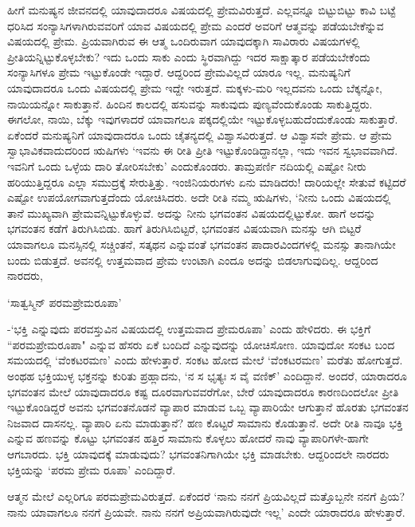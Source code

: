 ಹೀಗೆ ಮನುಷ್ಯನ ಜೀವನದಲ್ಲಿ 
ಯಾವುದಾದರೂ ವಿಷಯದಲ್ಲಿ 
ಪ್ರೇಮವಿರುತ್ತದೆ. ಎಲ್ಲವನ್ನೂ 
ಬಿಟ್ಟುಬಿಟ್ಟು ಕಾವಿ ಬಟ್ಟೆ 
ಧರಿಸಿದ 
ಸಂನ್ಯಾಸಿಗಳಾಗಿರುವವರಿಗೆ 
ಯಾವ ವಿಷಯದಲ್ಲಿ ಪ್ರೇಮ ಎಂದರೆ 
ಅವರಿಗೆ ಆತ್ಮವನ್ನು 
ಪಡೆಯಬೇಕೆನ್ನುವ ವಿಷಯದಲ್ಲಿ 
ಪ್ರೇಮ. ಪ್ರಿಯವಾಗಿರುವ ಈ ಆತ್ಮ 
ಒಂದಿರುವಾಗ ಯಾವುದಕ್ಕಾಗಿ 
ಸಾವಿರಾರು ವಿಷಯಗಳಲ್ಲಿ 
ಪ್ರೀತಿಯನ್ನಿಟ್ಟುಕೊಳ್ಳಬೇಕು? ಇದು ಒಂದು ಸಾಕು ಎಂದು ಸ್ಥಿರವಾಗಿದ್ದು ಇದರ ಸಾಕ್ಷಾತ್ಕಾರ ಪಡೆಯಬೇಕೆಂದು ಸಂನ್ಯಾಸಿಗಳೂ ಪ್ರೇಮ ಇಟ್ಟುಕೊಂಡೇ ಇದ್ದಾರೆ. ಆದ್ದರಿಂದ ಪ್ರೇಮವಿಲ್ಲದೆ ಯಾರೂ ಇಲ್ಲ. ಮನುಷ್ಯನಿಗೆ ಯಾವುದಾದರೂ ಒಂದು ವಿಷಯದಲ್ಲಿ ಪ್ರೇಮ ಇದ್ದೇ ಇರುತ್ತದೆ. ಮಕ್ಕಳು-ಮರಿ ಇಲ್ಲದವನು ಒಂದು ಬೆಕ್ಕನ್ನೋ, ನಾಯಿಯನ್ನೋ ಸಾಕುತ್ತಾನೆ. ಹಿಂದಿನ ಕಾಲದಲ್ಲಿ ಹಸುವನ್ನು ಸಾಕುವುದು ಪುಣ್ಯವೆಂದುಕೊಂಡು ಸಾಕುತ್ತಿದ್ದರು. ಈಗಲೋ, ನಾಯಿ, ಬೆಕ್ಕು ಇವುಗಳಾದರೆ ಯಾವಾಗಲೂ ಪಕ್ಕದಲ್ಲಿಯೇ ಇಟ್ಟುಕೊಳ್ಳಬಹುದೆಂದುಕೊಂಡು ಸಾಕುತ್ತಾರೆ. ಏಕೆಂದರೆ ಮನುಷ್ಯನಿಗೆ ಯಾವುದಾದರೂ ಒಂದು ಚೈತನ್ಯದಲ್ಲಿ ವಿಶ್ವಾಸವಿರುತ್ತದೆ. ಆ ವಿಶ್ವಾಸವೇ ಪ್ರೇಮ. ಆ ಪ್ರೇಮ ಸ್ವಾಭಾವಿಕವಾದುದರಿಂದ ಋಷಿಗಳು `ಇವನು ಈ ರೀತಿ ಪ್ರೀತಿ ಇಟ್ಟುಕೊಂಡಿದ್ದಾನಲ್ಲಾ, ಇದು ಇವನ ಸ್ವಭಾವವಾಗಿದೆ. ಇವನಿಗೆ ಒಂದು ಒಳ್ಳೆಯ ದಾರಿ ತೋರಿಸಬೇಕು' ಎಂದುಕೊಂಡರು. ತಾಮ್ರಪರ್ಣಿ ನದಿಯಲ್ಲಿ ಎಷ್ಟೋ ನೀರು ಹರಿಯುತ್ತಿದ್ದರೂ ಎಲ್ಲಾ ಸಮುದ್ರಕ್ಕೆ ಸೇರುತ್ತಿತ್ತು. ಇಂಜಿನಿಯರುಗಳು ಏನು ಮಾಡಿದರು! ದಾರಿಯಲ್ಲೇ ಸೇತುವೆ ಕಟ್ಟಿದರೆ ಎಷ್ಟೋ ಉಪಯೋಗವಾಗುತ್ತದೆಂದು ಯೋಚಿಸಿದರು. ಅದೇ ರೀತಿ ನಮ್ಮ ಋಷಿಗಳು, `ನೀನು ಒಂದು ವಿಷಯದಲ್ಲಿ ತಾನೆ ಮುಖ್ಯವಾಗಿ ಪ್ರೇಮವನ್ನಿಟ್ಟುಕೊಳ್ಳುವೆ. ಅದನ್ನು ನೀನು ಭಗವಂತನ ವಿಷಯದಲ್ಲಿಟ್ಟುಕೋ. ಹಾಗೆ ಅದನ್ನು ಭಗವಂತನ ಕಡೆಗೆ ತಿರುಗಿಸಿಬಿಡು. ಹಾಗೆ ತಿರುಗಿಸಿಬಿಟ್ಟರೆ, ಭಗವಂತನ ವಿಷಯವಾಗಿ ಮನಸ್ಸು ಆಗಿ ಬಿಟ್ಟರೆ ಯಾವಾಗಲೂ ಮನಸ್ಸಿನಲ್ಲಿ ಸಚ್ಚಿಂತನೆ, ಸತ್ಕಥನ ಎನ್ನುವಂತೆ ಭಗವಂತನ ಪಾದಾರವಿಂದಗಳಲ್ಲಿ ಮನಸ್ಸು ತಾನಾಗಿಯೇ ಬಂದು ಬಿಡುತ್ತದೆ. ಅವನಲ್ಲಿ ಉತ್ತಮವಾದ ಪ್ರೇಮ ಉಂಟಾಗಿ ಎಂದೂ ಅದನ್ನು ಬಿಡಲಾಗುವುದಿಲ್ಲ. ಆದ್ದರಿಂದ ನಾರದರು, 

\begin{shloka}
`ಸಾತ್ವಸ್ಮಿನ್ ಪರಮಪ್ರೇಮರೂಪಾ'
\end{shloka}

-`ಭಕ್ತಿ ಎನ್ನುವುದು 
ಪರವಸ್ತುವಿನ ವಿಷಯದಲ್ಲಿ 
ಉತ್ತಮವಾದ ಪ್ರೇಮರೂಪಾ' ಎಂದು 
ಹೇಳಿದರು. ಈ ಭಕ್ತಿಗೆ 
``ಪರಮಪ್ರೇಮರೂಪಾ" ಎನ್ನುವ 
ಹೆಸರು ಏಕೆ ಬಂದಿದೆ 
ಎನ್ನುವುದನ್ನು ಯೋಚಿಸೋಣ. 
ಯಾವುದೋ ಸಂಕಟ ಬಂದ ಸಮಯದಲ್ಲಿ 
`ವೆಂಕಟರಮಣ' ಎಂದು ಹೇಳುತ್ತಾರೆ. 
ಸಂಕಟ ಹೋದ ಮೇಲೆ `ವೆಂಕಟರಮಣ' 
ಮರೆತು ಹೋಗುತ್ತದೆ. ಅಂಥಹ 
ಭಕ್ತಿಯುಳ್ಳ ಭಕ್ತನನ್ನು 
ಕುರಿತು ಪ್ರಹ್ಲಾದನು, `ನ ಸ 
ಭೃತ್ಯಃ ಸ ವೈ ವಣಿಕ್' 
ಎಂದಿದ್ದಾನೆ. ಅಂದರೆ, ಯಾರಾದರೂ 
ಭಗವಂತನ ಮೇಲೆ ಯಾವುದಾದರೂ 
ಕಷ್ಟ ದೂರವಾಗುವವರೆಗೋ, ಬೇರೆ 
ಯಾವುದಾದರೂ ಕಾರಣದಿಂದಲೋ 
ಪ್ರೀತಿ ಇಟ್ಟುಕೊಂಡಿದ್ದರೆ 
ಅವನು ಭಗವಂತನೊಡನೆ ವ್ಯಾಪಾರ 
ಮಾಡುವ ಒಬ್ಬ ವ್ಯಾಪಾರಿಯೇ 
ಆಗುತ್ತಾನೆ ಹೊರತು ಭಗವಂತನ 
ನಿಜವಾದ ದಾಸನಲ್ಲ. ವ್ಯಾಪಾರಿ 
ಏನು ಮಾಡುತ್ತಾನೆ? ಹಣ ಕೊಟ್ಟರೆ 
ಸಾಮಾನು ಕೊಡುತ್ತಾನೆ. ಅದೇ 
ರೀತಿ ನಾವೂ ಭಕ್ತಿ ಎನ್ನುವ 
ಹಣವನ್ನು ಕೊಟ್ಟು ಭಗವಂತನ 
ಹತ್ತಿರ ಸಾಮಾನು ಕೊಳ್ಳಲು 
ಹೋದರೆ ನಾವು 
ವ್ಯಾಪಾರಿಗಳೇ-ಹಾಗೇ ಆಗಬಾರದು. 
ಭಕ್ತಿ ಯಾವುದಕ್ಕೆ ಮಾಡುವುದು? 
ಭಗವಂತನಿಗಾಗಿಯೇ ಭಕ್ತಿ 
ಮಾಡಬೇಕು. ಆದ್ದರಿಂದಲೇ ನಾರದರು ಭಕ್ತಿಯನ್ನು `ಪರಮ ಪ್ರೇಮ ರೂಪಾ' ಎಂದಿದ್ದಾರೆ.

ಆತ್ಮನ ಮೇಲೆ ಎಲ್ಲರಿಗೂ 
ಪರಮಪ್ರೇಮವಿರುತ್ತದೆ. 
ಏಕೆಂದರೆ `ನಾನು ನನಗೆ 
ಪ್ರಿಯವಿಲ್ಲದೆ ಮತ್ತೊಬ್ಬನೇ 
ನನಗೆ ಪ್ರಿಯ? ನಾನು ಯಾವಾಗಲೂ 
ನನಗೆ ಪ್ರಿಯವೇ. ನಾನು ನನಗೆ ಅಪ್ರಿಯವಾಗಿರುವುದೇ ಇಲ್ಲ' ಎಂದೇ ಯಾರಾದರೂ ಹೇಳುತ್ತಾರೆ.

